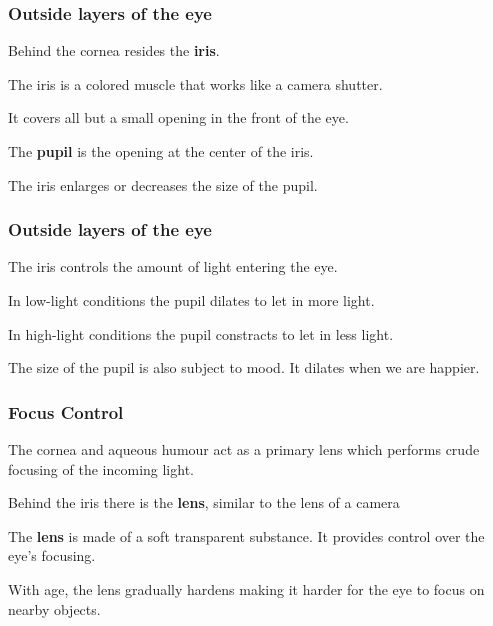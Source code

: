 \documentclass[12pt]{beamer}\usepackage[]{graphicx}\usepackage[]{color}
\begin{document}
\begin{frame}
\begin{center}
\end{center}
\end{frame}


\begin{frame}
\frametitle{Outside layers of the eye}

\bbi
  \item Behind the cornea resides the \textbf{iris}.
  \item The iris is a colored muscle that works like a camera shutter.
  \item It covers all but a small opening in the front of the eye.
  \item The \textbf{pupil} is the opening at the center of the iris.
  \item The iris enlarges or decreases the size of the pupil.
\ei
\eb

\end{frame}


\begin{frame}
\frametitle{Outside layers of the eye}

\bbi
  \item The iris controls the amount of light entering the eye.
  \item In low-light conditions the pupil dilates to let in more light.
  \item In high-light conditions the pupil constracts to let in less light.
  \item The size of the pupil is also subject to mood. It dilates when we are
  happier.
\ei
\eb

\end{frame}


\begin{frame}
\begin{center}
\end{center}
\end{frame}


\begin{frame}
\frametitle{Focus Control}

\bbi
  \item The cornea and aqueous humour act as a primary lens which performs
  crude focusing of the incoming light.
  \item Behind the iris there is the \textbf{lens}, similar to the lens of
  a camera
  \item The \textbf{lens} is made of a soft transparent substance. It provides
  control over the eye's focusing.
  \item With age, the lens gradually hardens making it harder for the eye to
  focus on nearby objects.
\ei

\end{frame}
\end{document}
